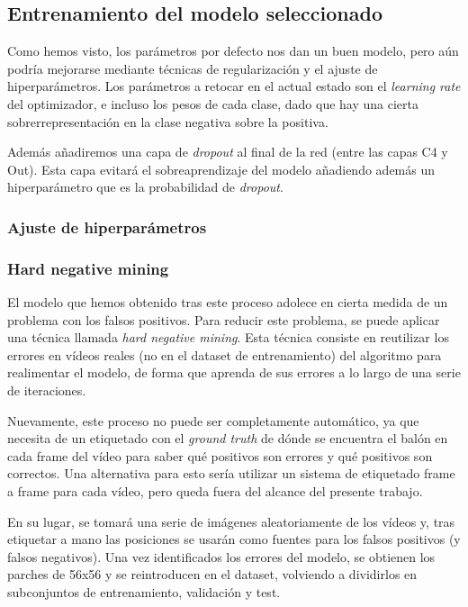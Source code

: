 \subsection{Entrenamiento del modelo seleccionado}

Como hemos visto, los parámetros por defecto nos dan un buen modelo, pero aún podría mejorarse mediante técnicas de regularización y el ajuste de hiperparámetros. Los parámetros a retocar en el actual estado son el \textit{learning rate} del optimizador, e incluso los pesos de cada clase, dado que hay una cierta sobrerrepresentación en la clase negativa sobre la positiva.

Además añadiremos una capa de \textit{dropout} al final de la red (entre las capas C4 y Out). Esta capa evitará el sobreaprendizaje del modelo añadiendo además un hiperparámetro que es la probabilidad de \textit{dropout}.

\subsubsection*{Ajuste de hiperparámetros}

\subsubsection*{Hard negative mining}

El modelo que hemos obtenido tras este proceso adolece en cierta medida de un problema con los falsos positivos. Para reducir este problema, se puede aplicar una técnica llamada \textit{hard negative mining}. Esta técnica consiste en reutilizar los errores en vídeos reales (no en el dataset de entrenamiento) del algoritmo para realimentar el modelo, de forma que aprenda de sus errores a lo largo de una serie de iteraciones.

Nuevamente, este proceso no puede ser completamente automático, ya que necesita de un etiquetado con el \textit{ground truth} de dónde se encuentra el balón en cada frame del vídeo para saber qué positivos son errores y qué positivos son correctos. Una alternativa para esto sería utilizar un sistema de etiquetado frame a frame para cada vídeo, pero queda fuera del alcance del presente trabajo.

En su lugar, se tomará una serie de imágenes aleatoriamente de los vídeos y, tras etiquetar a mano las posiciones se usarán como fuentes para los falsos positivos (y falsos negativos). Una vez identificados los errores del modelo, se obtienen los parches de 56x56 y se reintroducen en el dataset, volviendo a dividirlos en subconjuntos de entrenamiento, validación y test.

